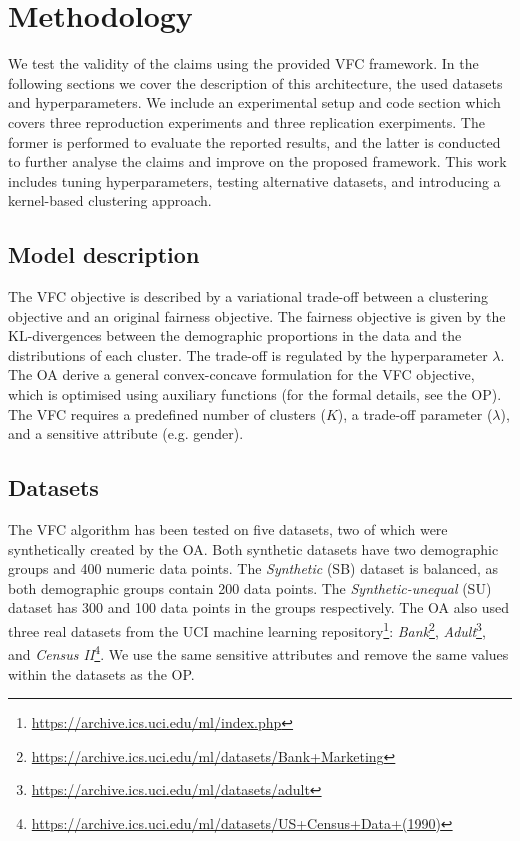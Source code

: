 \section{Methodology}
We test the validity of the claims using the provided VFC framework. In the following sections we cover the description of this architecture, the used datasets and hyperparameters. We include an experimental setup and code section which covers three reproduction experiments and three replication exerpiments. The former is performed to evaluate the reported results, and the latter is conducted to further analyse the claims and improve on the proposed framework. This work includes tuning hyperparameters, testing alternative datasets, and introducing a kernel-based clustering approach.

\subsection{Model description}

The VFC objective is described by a variational trade-off between a clustering objective and an original fairness objective. The fairness objective is given by the KL-divergences between the demographic proportions in the data and the distributions of each cluster. The trade-off is regulated by the hyperparameter $\lambda$. The OA derive a general convex-concave formulation for the VFC objective, which is optimised using auxiliary functions (for the formal details, see the OP). The VFC requires a predefined number of clusters ($K$), a trade-off parameter ($\lambda$), and a sensitive attribute (e.g. gender).

\subsection{Datasets}
The VFC algorithm has been tested on five datasets, two of which were synthetically created by the OA. Both synthetic datasets have two demographic groups and 400 numeric data points. The \textit{Synthetic} (SB) dataset is balanced, as both demographic groups contain 200 data points. The \textit{Synthetic-unequal} (SU) dataset has 300 and 100 data points in the groups respectively. The OA also used three real datasets from the UCI machine learning repository\footnote{\url{https://archive.ics.uci.edu/ml/index.php}}: \textit{Bank}\footnote{\url{https://archive.ics.uci.edu/ml/datasets/Bank+Marketing}}, \textit{Adult}\footnote{\url{https://archive.ics.uci.edu/ml/datasets/adult}}, and \textit{Census II}\footnote{\url{https://archive.ics.uci.edu/ml/datasets/US+Census+Data+(1990)}}. We use the same sensitive attributes and remove the same values within the datasets as the OP. 

